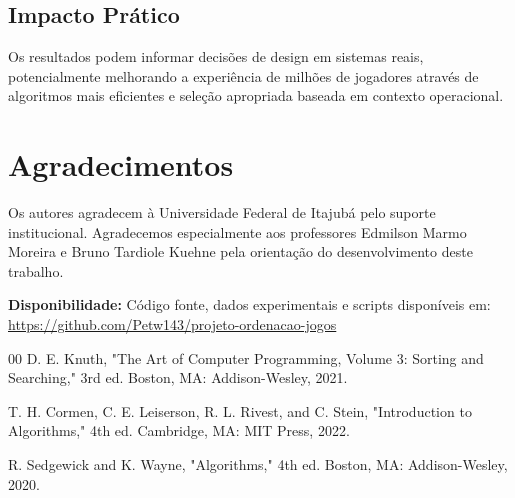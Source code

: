 \documentclass[conference]{IEEEtran}
\begin{document}
\subsection{Impacto Prático}

Os resultados podem informar decisões de design em sistemas reais, potencialmente melhorando a experiência de milhões de jogadores através de algoritmos mais eficientes e seleção apropriada baseada em contexto operacional.

\section{Agradecimentos}

Os autores agradecem à Universidade Federal de Itajubá pelo suporte institucional. Agradecemos especialmente aos professores Edmilson Marmo Moreira e Bruno Tardiole Kuehne pela orientação do desenvolvimento deste trabalho.

\textbf{Disponibilidade:} Código fonte, dados experimentais e scripts disponíveis em: \url{https://github.com/Petw143/projeto-ordenacao-jogos}

\begin{thebibliography}{00}
 D. E. Knuth, "The Art of Computer Programming, Volume 3: Sorting and Searching," 3rd ed. Boston, MA: Addison-Wesley, 2021.

 T. H. Cormen, C. E. Leiserson, R. L. Rivest, and C. Stein, "Introduction to Algorithms," 4th ed. Cambridge, MA: MIT Press, 2022.

 R. Sedgewick and K. Wayne, "Algorithms," 4th ed. Boston, MA: Addison-Wesley, 2020.
\end{thebibliography}
\end{document}
